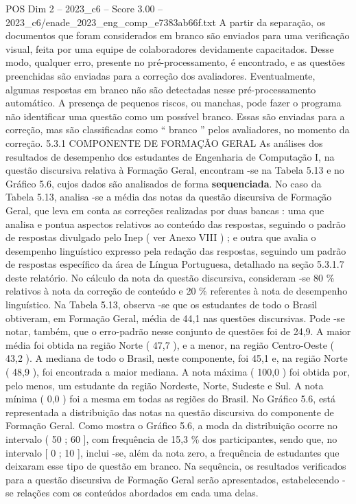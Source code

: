 \begin{textsample}{POS Dim 2 – 2023\_c6 – Score 3.00 – 2023\_c6/enade\_2023\_eng\_comp\_e7383ab66f.txt}
A partir da separação, os documentos que foram considerados em branco são enviados para uma verificação visual, feita por uma equipe de colaboradores devidamente capacitados.
Desse modo, qualquer erro, presente no pré-processamento, é encontrado, e as questões preenchidas são enviadas para a correção dos avaliadores.
Eventualmente, algumas respostas em branco não são detectadas nesse pré-processamento automático.
A presença de pequenos riscos, ou manchas, pode fazer o programa não identificar uma questão como um possível branco.
Essas são enviadas para a correção, mas são classificadas como “ branco ” pelos avaliadores, no momento da correção. 5.3.1 COMPONENTE DE FORMAÇÃO GERAL As análises dos resultados de desempenho dos estudantes de Engenharia de Computação I, na questão discursiva relativa à Formação Geral, encontram -se na Tabela 5.13 e no Gráfico 5.6, cujos dados são analisados de forma \textbf{sequenciada}.
No caso da Tabela 5.13, analisa -se a média das notas da questão discursiva de Formação Geral, que leva em conta as correções realizadas por duas bancas : uma que analisa e pontua aspectos relativos ao conteúdo das respostas, seguindo o padrão de respostas divulgado pelo Inep ( ver Anexo VIII ) ; e outra que avalia o desempenho linguístico expresso pela redação das respostas, seguindo um padrão de respostas específico da área de Língua Portuguesa, detalhado na seção 5.3.1.7 deste relatório.
No cálculo da nota da questão discursiva, consideram -se 80 \% relativos à nota da correção de conteúdo e 20 \% referentes à nota de desempenho linguístico.
Na Tabela 5.13, observa -se que os estudantes de todo o Brasil obtiveram, em Formação Geral, média de 44,1 nas questões discursivas.
Pode -se notar, também, que o erro-padrão nesse conjunto de questões foi de 24,9.
A maior média foi obtida na região Norte ( 47,7 ), e a menor, na região Centro-Oeste ( 43,2 ).
A mediana de todo o Brasil, neste componente, foi 45,1 e, na região Norte ( 48,9 ), foi encontrada a maior mediana.
A nota máxima ( 100,0 ) foi obtida por, pelo menos, um estudante da região Nordeste, Norte, Sudeste e Sul.
A nota mínima ( 0,0 ) foi a mesma em todas as regiões do Brasil.
No Gráfico 5.6, está representada a distribuição das notas na questão discursiva do componente de Formação Geral.
Como mostra o Gráfico 5.6, a moda da distribuição ocorre no intervalo ( 50 ; 60 ], com frequência de 15,3 \% dos participantes, sendo que, no intervalo [ 0 ; 10 ], inclui -se, além da nota zero, a frequência de estudantes que deixaram esse tipo de questão em branco.
Na sequência, os resultados verificados para a questão discursiva de Formação Geral serão apresentados, estabelecendo -se relações com os conteúdos abordados em cada uma delas.

\end{textsample}
